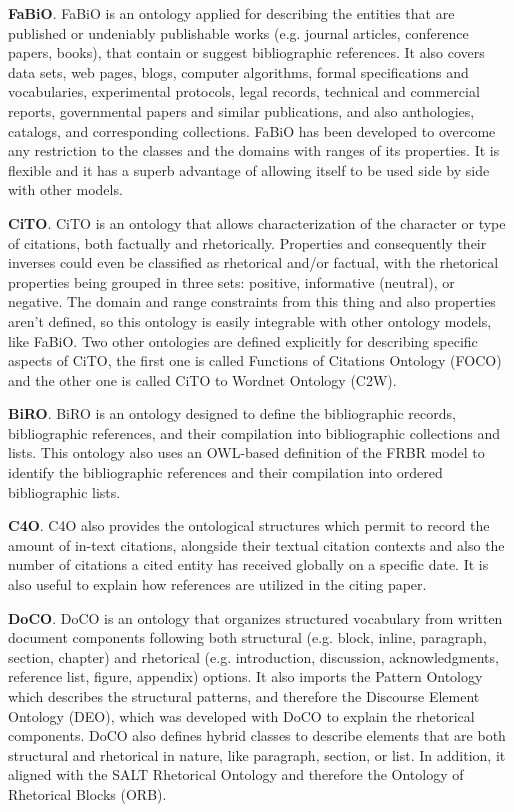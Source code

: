 \medskip
\noindent \textbf{FaBiO}. FaBiO\cite{DBLP:journals/ws/PeroniS12} is an ontology applied for describing the entities that are published or undeniably publishable works (e.g. journal articles, conference papers, books), that contain or suggest bibliographic references. It also covers data sets, web pages, blogs, computer algorithms, formal specifications and vocabularies, experimental protocols, legal records, technical and commercial reports, governmental papers and similar publications, and also anthologies, catalogs, and corresponding collections. FaBiO has been developed to overcome any restriction to the classes and the domains with ranges of its properties. It is flexible and it has a superb advantage of allowing itself to be used side by side with other models.

\medskip
\noindent \textbf{CiTO}. CiTO\cite{DBLP:journals/biomedsem/Shotton10} is an ontology that allows characterization of the character or type of citations, both factually and rhetorically. Properties and consequently their inverses could even be classified as rhetorical and/or factual, with the rhetorical properties being grouped in three sets: positive, informative (neutral), or negative. The domain and range constraints from this thing and also properties aren't defined, so this ontology is easily integrable with other ontology models, like FaBiO. Two other ontologies are defined explicitly for describing specific aspects of CiTO, the first one is called Functions of Citations Ontology (FOCO) and the other one is called CiTO to Wordnet Ontology (C2W).

\medskip
\noindent \textbf{BiRO}. BiRO\cite{DBLP:conf/esws/IorioNPSV14} is an ontology designed to define the bibliographic records, bibliographic references, and their compilation into bibliographic collections and lists. This ontology also uses an OWL-based definition of the FRBR model\cite{bowen2011frbr} to identify the bibliographic references and their compilation into ordered bibliographic lists.

\medskip
\noindent \textbf{C4O}. C4O\cite{DBLP:conf/semweb/OsbornePM14} also provides the ontological structures which permit to record the amount of in-text citations, alongside their textual citation contexts and also the number of citations a cited entity has received globally on a specific date. It is also useful to explain how references are utilized in the citing paper. 

\medskip
\noindent \textbf{DoCO}. DoCO\cite{DBLP:journals/semweb/ConstantinPPSV16} is an ontology that organizes structured vocabulary from written document components following both structural (e.g. block, inline, paragraph, section, chapter) and rhetorical (e.g. introduction, discussion, acknowledgments, reference list, figure, appendix) options. It also imports the Pattern Ontology which describes the structural patterns, and therefore the Discourse Element Ontology (DEO), which was developed with DoCO to explain the rhetorical components. DoCO also defines hybrid classes to describe elements that are both structural and rhetorical in nature, like paragraph, section, or list. In addition, it aligned with the SALT Rhetorical Ontology and therefore the Ontology of Rhetorical Blocks (ORB).


